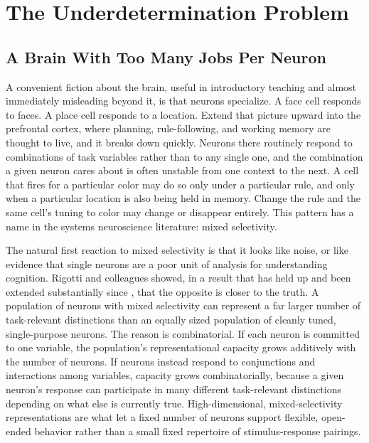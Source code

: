\documentclass[11pt]{book}
\begin{document}
\part{The Underdetermination Problem}

\chapter{A Brain With Too Many Jobs Per Neuron}

A convenient fiction about the brain, useful in introductory teaching and almost immediately misleading beyond it, is that neurons specialize. A face cell responds to faces. A place cell responds to a location. Extend that picture upward into the prefrontal cortex, where planning, rule-following, and working memory are thought to live, and it breaks down quickly. Neurons there routinely respond to combinations of task variables rather than to any single one, and the combination a given neuron cares about is often unstable from one context to the next. A cell that fires for a particular color may do so only under a particular rule, and only when a particular location is also being held in memory. Change the rule and the same cell's tuning to color may change or disappear entirely. This pattern has a name in the systems neuroscience literature: mixed selectivity.

The natural first reaction to mixed selectivity is that it looks like noise, or like evidence that single neurons are a poor unit of analysis for understanding cognition. Rigotti and colleagues showed, in a result that has held up and been extended substantially since \cite{rigotti2013}, that the opposite is closer to the truth. A population of neurons with mixed selectivity can represent a far larger number of task-relevant distinctions than an equally sized population of cleanly tuned, single-purpose neurons. The reason is combinatorial. If each neuron is committed to one variable, the population's representational capacity grows additively with the number of neurons. If neurons instead respond to conjunctions and interactions among variables, capacity grows combinatorially, because a given neuron's response can participate in many different task-relevant distinctions depending on what else is currently true. High-dimensional, mixed-selectivity representations are what let a fixed number of neurons support flexible, open-ended behavior rather than a small fixed repertoire of stimulus-response pairings.
\end{document}
